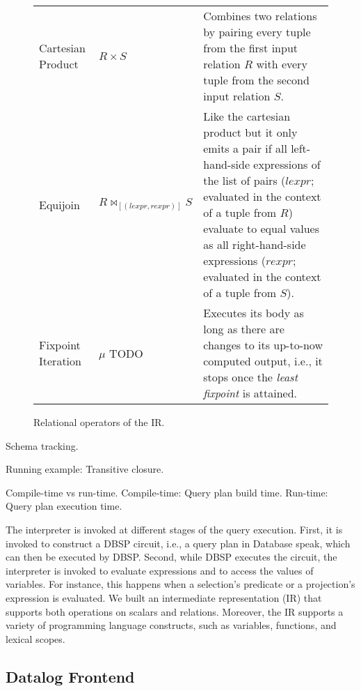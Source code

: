 \begin{figure}[htpb]
\begin{tabular}{@{}p{}p{}p{}@{}}
		Cartesian Product  & \(R \times S\)                                       & Combines two relations by pairing every tuple from the first input relation \(R\) with every tuple from the second input relation \(S\).                                                                                                                                                                          \\
		Equijoin           & \(R \bowtie_{[(\mathit{lexpr}, \mathit{rexpr})]} S\) & Like the cartesian product but it only emits a pair if all left-hand-side expressions of the list of pairs (\(\mathit{lexpr}\); evaluated in the context of a tuple from \(R\)) evaluate to equal values as all right-hand-side expressions (\(\mathit{rexpr}\); evaluated in the context of a tuple from \(S\)). \\
		Fixpoint Iteration & \(\mu\) TODO                                         & Executes its body as long as there are changes to its up-to-now computed output, i.e., it stops once the \emph{least fixpoint} is attained.                                                                                                                                                                       \\
		\bottomrule
	\end{tabular}
	\caption{Relational operators of the \ac{IR}.}\label{tab:ir-operators}
\end{figure}

Schema tracking.

Running example: Transitive closure.

Compile-time vs run-time.
Compile-time: Query plan build time.
Run-time: Query plan execution time.

The interpreter is invoked at different stages of the query execution.
First, it is invoked to construct a DBSP circuit, i.e., a query plan in
Database speak, which can then be executed by DBSP.
Second, while DBSP executes the circuit, the interpreter is invoked to
evaluate expressions and to access the values of variables. For instance,
this happens when a selection's predicate or a projection's expression
is evaluated.
We built an intermediate representation (IR) that supports both operations
on scalars and relations. Moreover, the IR supports a variety of programming
language constructs, such as variables, functions, and lexical scopes.

\subsection{Datalog Frontend}\label{sec:datalog-frontend}

